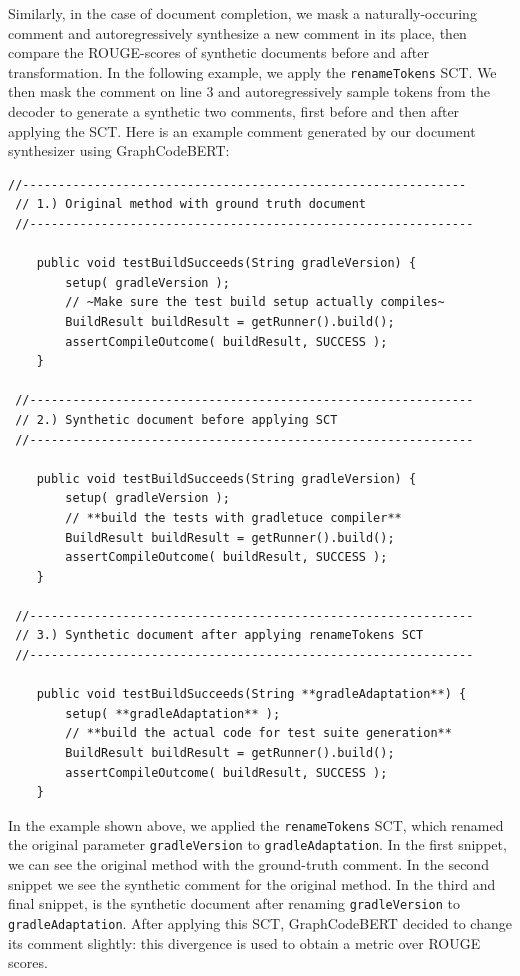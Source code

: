 \documentclass[sigconf,review,anonymous]{acmart}
\begin{document}
  Similarly, in the case of document completion, we mask a naturally-occuring comment and autoregressively synthesize a new comment in its place, then compare the ROUGE-scores of synthetic documents before and after transformation. In the following example, we apply the \lstinline|renameTokens| SCT. We then mask the comment on line 3 and autoregressively sample tokens from the decoder to generate a synthetic two comments, first before and then after applying the SCT. Here is an example comment generated by our document synthesizer using GraphCodeBERT:

  \begin{lstlisting}[basicstyle=\scriptsize\ttfamily]
 //--------------------------------------------------------------
 // 1.) Original method with ground truth document
 //--------------------------------------------------------------

    public void testBuildSucceeds(String gradleVersion) {
        setup( gradleVersion );
        // ~Make sure the test build setup actually compiles~
        BuildResult buildResult = getRunner().build();
        assertCompileOutcome( buildResult, SUCCESS );
    }

 //--------------------------------------------------------------
 // 2.) Synthetic document before applying SCT
 //--------------------------------------------------------------

    public void testBuildSucceeds(String gradleVersion) {
        setup( gradleVersion );
        // **build the tests with gradletuce compiler**
        BuildResult buildResult = getRunner().build();
        assertCompileOutcome( buildResult, SUCCESS );
    }

 //--------------------------------------------------------------
 // 3.) Synthetic document after applying renameTokens SCT
 //--------------------------------------------------------------

    public void testBuildSucceeds(String **gradleAdaptation**) {
        setup( **gradleAdaptation** );
        // **build the actual code for test suite generation**
        BuildResult buildResult = getRunner().build();
        assertCompileOutcome( buildResult, SUCCESS );
    }
  \end{lstlisting}

  In the example shown above, we applied the \lstinline|renameTokens| SCT, which renamed the original parameter \lstinline|gradleVersion| to \lstinline|gradleAdaptation|. In the first snippet, we can see the original method with the ground-truth comment. In the second snippet we see the synthetic comment for the original method. In the third and final snippet, is the synthetic document after renaming \lstinline|gradleVersion| to \lstinline|gradleAdaptation|. After applying this SCT, GraphCodeBERT decided to change its comment slightly: this divergence is used to obtain a metric over ROUGE scores.
\end{document}

